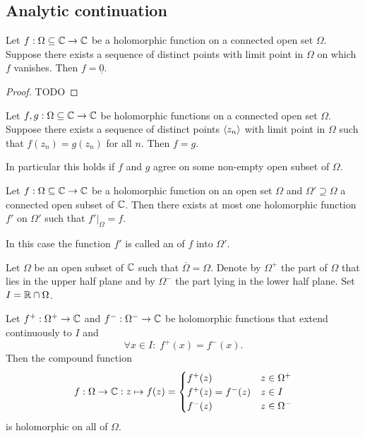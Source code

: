 \subsection{Analytic continuation}
\begin{proposition}
Let $f:\Omega\subseteq \mathbb{C}\to \mathbb{C}$ be a holomorphic function on a connected open set $\Omega$. Suppose there exists a sequence of distinct points with limit point in $\Omega$ on which $f$ vanishes. Then $f = \underline{0}$.
\end{proposition}
\begin{proof}
TODO
\end{proof}
\begin{corollary}
Let $f,g:\Omega\subseteq \mathbb{C}\to \mathbb{C}$ be holomorphic functions on a connected open set $\Omega$. Suppose there exists a sequence of distinct points $\left\langle z_n \right\rangle$ with limit point in $\Omega$ such that $f(z_n) = g(z_n)$ for all $n$. Then $f = g$.
\end{corollary}
In particular this holds if $f$ and $g$ agree on some non-empty open subset of $\Omega$.
\begin{corollary}
Let $f:\Omega\subseteq \mathbb{C}\to \mathbb{C}$ be a holomorphic function on an open set $\Omega$ and $\Omega'\supseteq \Omega$ a connected open subset of $\mathbb{C}$. Then there exists at most one holomorphic function $f'$ on $\Omega'$ such that $f'|_\Omega = f$.
\end{corollary}

\begin{definition}
In this case the function $f'$ is called an  of $f$ into $\Omega'$.
\end{definition}

\begin{proposition} \label{symmetryPrinciple}
Let $\Omega$ be an open subset of $\mathbb{C}$ such that $\overline{\Omega} = \Omega$. Denote by $\Omega^+$ the part of $\Omega$ that lies in the upper half plane and by $\Omega^-$ the part lying in the lower half plane. Set $I = \mathbb{R} \cap \Omega$.

Let $f^+: \Omega^+ \to \mathbb{C}$ and $f^-: \Omega^- \to \mathbb{C}$ be holomorphic functions that extend continuously to $I$ and
\[ \forall x\in I: \; f^+(x) = f^-(x). \]
Then the compound function
\[ f: \Omega \to \mathbb{C}: z\mapsto f(z) = \begin{cases}
f^+(z) & z\in \Omega^+ \\
f^+(z) = f^-(z) & z\in I \\
f^-(z) & z\in \Omega^-
\end{cases} \]
is holomorphic on all of $\Omega$.
\end{proposition}

